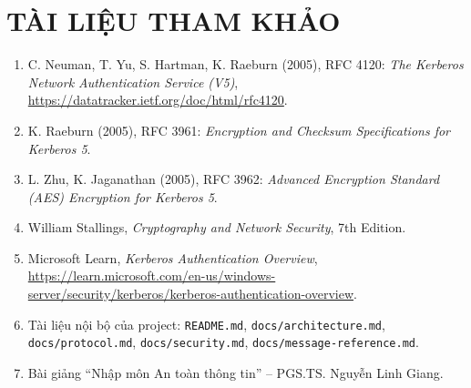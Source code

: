 \documentclass[12pt]{article}
\begin{document}
\section*{TÀI LIỆU THAM KHẢO}
\begin{enumerate}
    \item C. Neuman, T. Yu, S. Hartman, K. Raeburn (2005), RFC 4120: \textit{The Kerberos Network Authentication Service (V5)}, \url{https://datatracker.ietf.org/doc/html/rfc4120}.
    \item K. Raeburn (2005), RFC 3961: \textit{Encryption and Checksum Specifications for Kerberos 5}.
    \item L. Zhu, K. Jaganathan (2005), RFC 3962: \textit{Advanced Encryption Standard (AES) Encryption for Kerberos 5}.
    \item William Stallings, \textit{Cryptography and Network Security}, 7th Edition.
    \item Microsoft Learn, \textit{Kerberos Authentication Overview}, \url{https://learn.microsoft.com/en-us/windows-server/security/kerberos/kerberos-authentication-overview}.
    \item Tài liệu nội bộ của project: \texttt{README.md}, \texttt{docs/architecture.md}, \texttt{docs/protocol.md}, \texttt{docs/security.md}, \texttt{docs/message-reference.md}.
    \item Bài giảng ``Nhập môn An toàn thông tin'' -- PGS.TS. Nguyễn Linh Giang.
\end{enumerate}
\end{document}
